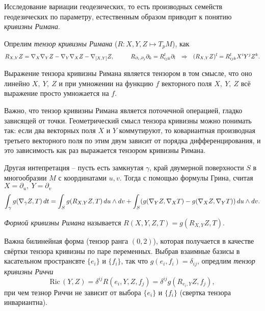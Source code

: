 
Исследование вариации геодезических, то есть производных семейств геодезических по параметру, естественным образом приводит к понятию \textit{кривизны Римана}. 

\begin{to_def} 
    Опрелим \textit{тензор кривизны Римана} ($R \colon X, Y, Z \mapsto T_p M$), как
\begin{equation*}
    R_{X, Y} Z = \nabla_X \nabla_Y Z - \nabla_Y \nabla_X Z - \nabla_{[X, Y]} Z,
    \hspace{1cm} 
    R_{\partial_i, \partial_j} \partial_k = R_{ijk}^l \partial_l
    \hspace{0.25cm} \Rightarrow \hspace{0.25cm} 
    (R_{X,Y} Z)^l = R^l_{ijk} X^i Y^j Z^k.
\end{equation*}
\end{to_def}

\begin{to_thr} 
    Выражение тензора кривизны Римана является тензором в том смысле, что оно линейно $X, \ Y, \ Z$ и при умножении на функцию $f$ векторного поля $X, \ Y,\ Z$ всё выражение просто умножается на $f$.
\end{to_thr}

Важно, что тензор кривизны Римана является поточечной операцией, гладко зависящей от точки. Геометрический смысл тензора кривизны можно понимать так: если два векторных поля $X$ и $Y$ коммутируют, то ковариантная производная третьего векторного поля по этим двум зависит от порядка дифференцирования, и это зависимость как раз выражается тензором кривизны Римана. 

Другая интепретация -- пусть есть замкнутая $\gamma$, край двумерной поверхности $S$ в многообразии $M$ с координатами $u, v$. Тогда с помощью формулы Грина, считая $X = \partial_u, \ Y = \partial_v$
\begin{equation*}
    \int_\gamma g(\nabla_{\dot{\gamma}} Z, T) \, d t = 
    \int_S g(R_{X, Y} Z, T) \, d u \wedge d v + \int_S
    (
        g(\nabla_Y Z, \nabla_X T) - g(\nabla_X Z, \nabla_Y T)
    ) \, d u \wedge d v.
\end{equation*}
\begin{to_def} 
    \textit{Формой кривизны Римана} называется $R(X, Y, Z, T) = g(R_{X, Y} Z, T)$.
\end{to_def}

\begin{to_def} 
    Важна билинейная форма (тензор ранга $(0, 2)$), которая получается в качестве свёртки тензора кривизны по паре переменных. Выбрав взаимные базисы в касательном пространсвте $\{e_i\}$ и $\{f_i\}$, так что $g(e_i, f_i) = \delta_{ij}$, опредлим \textit{тензор кривизны Риччи}
    \begin{equation*}
        \text{Ric}\, (Y, Z) = \delta^{ij} R(e_i, Y, Z, f_j) = \delta^{ij} g(R_{e_i, Y} Z, f_j),
    \end{equation*}
    при чем тезнор Риччи не зависит от выбора $\{e_i\}$ и $\{f_i\}$ (свертка тензора инвариантна).
\end{to_def}

